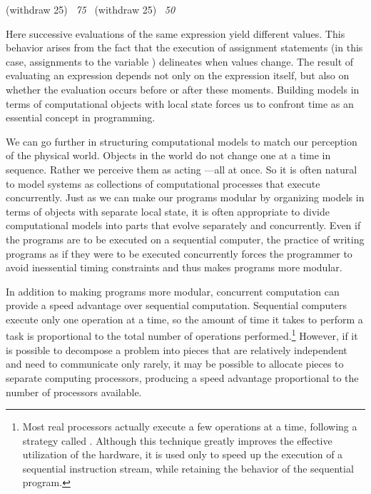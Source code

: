\begin{codeBlock}
(withdraw 25)
~\textit{75}~
(withdraw 25)
~\textit{50}~
\end{codeBlock}

\noindent
Here successive evaluations of the same expression yield different values.
This behavior arises from the fact that the execution of assignment statements
(in this case, assignments to the variable ) delineates
 when values change.  The result of evaluating an
expression depends not only on the expression itself, but also on whether the
evaluation occurs before or after these moments.  Building models in terms of
computational objects with local state forces us to confront time as an
essential concept in programming.

We can go further in structuring computational models to match our perception
of the physical world.  Objects in the world do not change one at a time in
sequence.  Rather we perceive them as acting ---all at
once.  So it is often natural to model systems as collections of computational
processes that execute concurrently.  Just as we can make our programs modular
by organizing models in terms of objects with separate local state, it is often
appropriate to divide computational models into parts that evolve separately
and concurrently.  Even if the programs are to be executed on a sequential
computer, the practice of writing programs as if they were to be executed
concurrently forces the programmer to avoid inessential timing constraints and
thus makes programs more modular.

In addition to making programs more modular, concurrent computation can provide
a speed advantage over sequential computation.  Sequential computers execute
only one operation at a time, so the amount of time it takes to perform a task
is proportional to the total number of operations performed.\footnote{Most real
processors actually execute a few operations at a time, following a strategy
called .  Although this technique greatly improves the
effective utilization of the hardware, it is used only to speed up the
execution of a sequential instruction stream, while retaining the behavior of
the sequential program.}  However, if it is possible to decompose a problem
into pieces that are relatively independent and need to communicate only
rarely, it may be possible to allocate pieces to separate computing processors,
producing a speed advantage proportional to the number of processors available.

